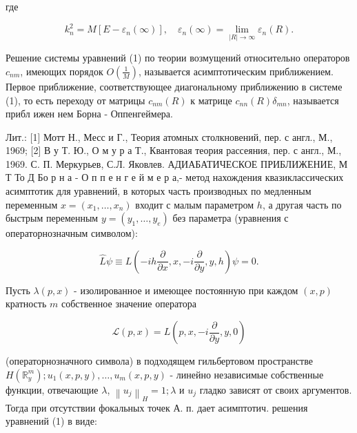 \documentclass[10pt]{article}
\begin{document}
где



\[

k_{n}^{2}=M\left[E-\varepsilon_{n}(\infty)\right], \quad \varepsilon_{n}(\infty)=\lim _{|R| \rightarrow \infty} \varepsilon_{n}(R) .

\]



Решение системы уравнений (1) по теории возмущений относительно операторов $c_{n m}$, имеющих порядок $O\left(\frac{1}{M}\right)$, называется асимптотическим приближением. Первое приближение, соответствующее диагональному приближению в системе (1), то есть переходу от матрицы $c_{n m}(R)$ к матрице $c_{n n}(R) \delta_{m n}$, называется прибл ижен нем Борна - Оппенгеймера.



Лит.: [1] Мотт Н., Месс и Г., Теория атомных столкновений, пер. с англ., М., 1969; [2] В у Т. Ю., О м у р а Т., Квантовая теория рассеяния, пер. с англ., М., 1969. С. П. Меркурьев, С.Л. Яковлев. АДИАБАТИЧЕСКОЕ ПРИБЛИЖЕНИЕ, М Т То Д Бо р н а - О п п е н г е й м е р а,- метод нахождения квазиклассических асимптотик для уравнений, в которых часть производных по медленным переменным $x=\left(x_{1}, \ldots, x_{n}\right)$ входит с малым параметром $h$, а другая часть по быстрым переменным $y=\left(y_{1}, \ldots, y_{e}\right)$ без параметра (уравнения с операторнозначным символом):



\[

\hat{L} \psi \equiv L\left(-i h \frac{\partial}{\partial x}, x,-i \frac{\partial}{\partial y}, y, h\right) \psi=0 .

\]



Пусть $\lambda(p, x)$ - изолированное и имеющее постоянную при каждом $(x, p)$ кратность $m$ собственное значение оператора



\[

\mathscr{L}(p, x)=L\left(p, x,-i \frac{\partial}{\partial y}, y, 0\right)

\]



(операторнозначного символа) в подходящем гильбертовом пространстве $H\left(\mathbb{R}_{y}^{m}\right) ; u_{1}(x, p, y), \ldots, u_{m}(x, p, y)$ - линейно независимые собственные функции, отвечающие $\lambda$, $\left\|u_{j}\right\|_{H}=1 ; \lambda$ и $u_{j}$ гладко зависят от своих аргументов. Тогда при отсутствии фокальных точек А. п. дает асимптотич. решения уравнений (1) в виде:
\end{document}
